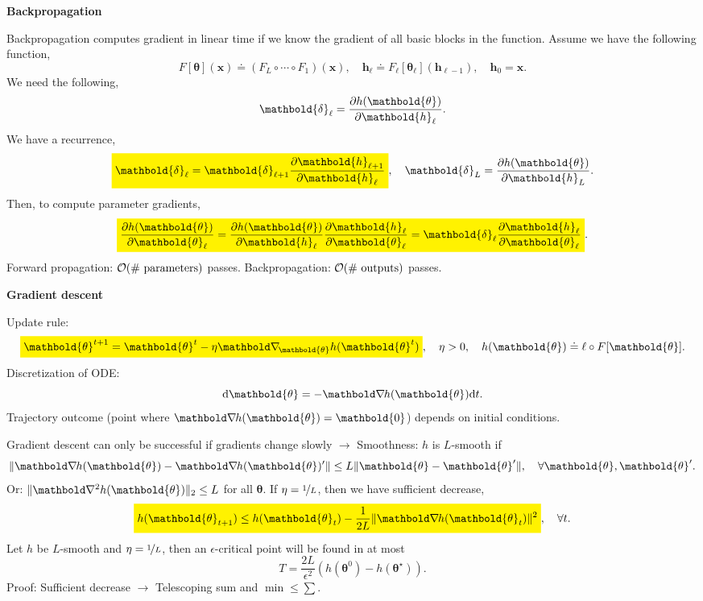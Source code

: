 \documentclass[10pt]{article}
\newenvironment{topic}[1]
{\textbf{\sffamily \footnotesize \colorbox{black}{\rlap{\textbf{\textcolor{white}{#1}}}\hspace{\linewidth}\hspace{-2\fboxsep}}}}
{}
\newenvironment{subtopic}[1]
{\begin{center}\textbf{\footnotesize \sffamily #1}\end{center}}
{}
\renewcommand{\vec}[1]{\ensuremath{\mathbold{#1}}}
\begin{document}
\begin{multicols*}{3}
\begin{topic}{Feedforward networks}
    \end{topic}

    \begin{topic}{Gradient-based learning}

        \begin{subtopic}{Backpropagation}
            Backpropagation computes gradient in linear time if we know the gradient of all basic
            blocks in the function. Assume we have the following function, \[
                F[\vec{\theta}](\vec{x}) \doteq (F_L \circ \cdots \circ F_1)(\vec{x}), \quad \vec{h}_{\ell} \doteq F_{\ell}[\vec{\theta}_{\ell}](\vec{h}_{\ell-1}), \quad \vec{h}_0 = \vec{x}.
            \]
            We need the following, \[
                \vec{\delta}_{\ell} = \pdv{h(\vec{\theta})}{\vec{h}_{\ell}}.
            \]
            We have a recurrence, \[
                \colorbox{yellow}{$\displaystyle \vec{\delta}_{\ell} = \vec{\delta}_{\ell+1} \pdv{\vec{h}_{\ell+1}}{\vec{h}_{\ell}}$}, \quad \vec{\delta}_L = \pdv{h(\vec{\theta})}{\vec{h}_L}.
            \]
            Then, to compute parameter gradients, \[
                \colorbox{yellow}{$\displaystyle \pdv{h(\vec{\theta})}{\vec{\theta}_{\ell}} = \pdv{h(\vec{\theta})}{\vec{h}_{\ell}} \pdv{\vec{h}_{\ell}}{\vec{\theta}_{\ell}} = \vec{\delta}_{\ell} \pdv{\vec{h}_{\ell}}{\vec{\theta}_{\ell}}$}.
            \]
            Forward propagation: $\bigo{\text{\# parameters}}$ passes. Backpropagation: $\bigo{\text{\# outputs}}$ passes.
        \end{subtopic}

        \begin{subtopic}{Gradient descent}
            Update rule: \[
                \colorbox{yellow}{$\displaystyle \vec{\theta}^{t+1} = \vec{\theta}^t - \eta \grad{h(\vec{\theta}^t)}{\vec{\theta}}$}, \quad \eta > 0, \quad h(\vec{\theta}) \doteq \ell \circ F[\vec{\theta}].
            \]
            Discretization of ODE: \[
                \mathrm{d}\vec{\theta} = -\grad{h(\vec{\theta})}{} \mathrm{d}t.
            \]
            Trajectory outcome (point where $\grad{h(\vec{\theta})}{} = \vec{0}$) depends on initial
            conditions.

            Gradient descent can only be successful if gradients change slowly $\to$ Smoothness: $h$ is
            $L$-smooth if \[
                \| \grad{h(\vec{\theta})}{} - \grad{h(\vec{\theta})'}{} \| \leq L \| \vec{\theta} - \vec{\theta}' \|, \quad \forall \vec{\theta},\vec{\theta}'.
            \]
            Or: $\| \hess{h(\vec{\theta})}{} \|_2 \leq L$ for all $\vec{\theta}$. If $\eta = \nicefrac{1}{L}$,
            then we have sufficient decrease, \[
                \colorbox{yellow}{$\displaystyle h(\vec{\theta}_{t+1}) \leq h(\vec{\theta}_t) - \frac{1}{2L} \| \grad{h(\vec{\theta}_t)}{} \|^2$}, \quad \forall t.
            \]
            Let $h$ be $L$-smooth and $\eta=\nicefrac{1}{L}$, then an $\epsilon$-critical point will be found
            in at most \[
                T = \frac{2L}{\epsilon^2} (h(\vec{\theta}^0) - h(\vec{\theta}^\star)).
            \]
            Proof: Sufficient decrease $\to$ Telescoping sum and $\min \leq \sum$.


\end{subtopic}
\end{topic}
\end{multicols*}
\end{document}
